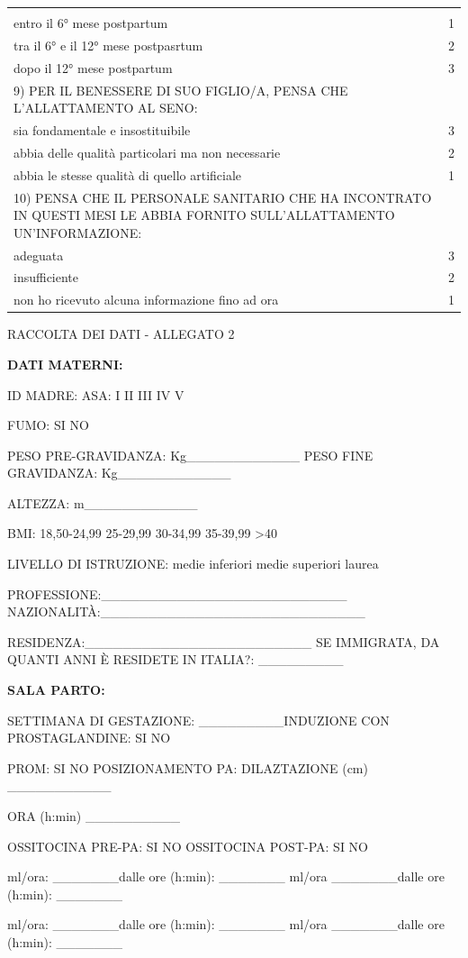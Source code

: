 \documentclass[]{article}
\begin{document}
\begin{longtable}[]{@{}ll@{}}
&\tabularnewline
entro il 6° mese postpartum & 1\tabularnewline
tra il 6° e il 12° mese postpasrtum & 2\tabularnewline
dopo il 12° mese postpartum & 3\tabularnewline
9) PER IL BENESSERE DI SUO FIGLIO/A, PENSA CHE L'ALLATTAMENTO AL SENO:
&\tabularnewline
sia fondamentale e insostituibile & 3\tabularnewline
abbia delle qualità particolari ma non necessarie & 2\tabularnewline
abbia le stesse qualità di quello artificiale & 1\tabularnewline
10) PENSA CHE IL PERSONALE SANITARIO CHE HA INCONTRATO IN QUESTI MESI LE
ABBIA FORNITO SULL'ALLATTAMENTO UN'INFORMAZIONE: &\tabularnewline
adeguata & 3\tabularnewline
insufficiente & 2\tabularnewline
non ho ricevuto alcuna informazione fino ad ora & 1\tabularnewline
\bottomrule
\end{longtable}

{RACCOLTA DEI DATI - ALLEGATO 2 }

\textbf{DATI MATERNI: }

ID MADRE: { } ASA: I II III IV V

FUMO: SI NO

PESO PRE-GRAVIDANZA: Kg\_\_\_\_\_\_\_\_\_\_\_\_ PESO FINE GRAVIDANZA:
Kg\_\_\_\_\_\_\_\_\_\_\_\_

ALTEZZA: m\_\_\_\_\_\_\_\_\_\_\_\_

BMI: 18,50-24,99 25-29,99 30-34,99 35-39,99 \textgreater{}40

LIVELLO DI ISTRUZIONE: medie inferiori medie superiori laurea

PROFESSIONE:\_\_\_\_\_\_\_\_\_\_\_\_\_\_\_\_\_\_\_\_\_\_\_\_\_\_
NAZIONALITÀ:\_\_\_\_\_\_\_\_\_\_\_\_\_\_\_\_\_\_\_\_\_\_\_\_\_\_\_\_

RESIDENZA:\_\_\_\_\_\_\_\_\_\_\_\_\_\_\_\_\_\_\_\_\_\_\_\_ SE IMMIGRATA,
DA QUANTI ANNI È RESIDETE IN ITALIA?: \_\_\_\_\_\_\_\_\_

\textbf{SALA PARTO:}

SETTIMANA DI GESTAZIONE: \_\_\_\_\_\_\_\_\_INDUZIONE CON PROSTAGLANDINE:
SI NO

PROM: SI NO POSIZIONAMENTO PA: DILAZTAZIONE (cm) \_\_\_\_\_\_\_\_\_\_\_

ORA (h:min) \_\_\_\_\_\_\_\_\_\_

OSSITOCINA PRE-PA: SI NO OSSITOCINA POST-PA: SI NO

ml/ora: \_\_\_\_\_\_\_dalle ore (h:min): \_\_\_\_\_\_\_ ml/ora
\_\_\_\_\_\_\_dalle ore (h:min): \_\_\_\_\_\_\_

ml/ora: \_\_\_\_\_\_\_dalle ore (h:min): \_\_\_\_\_\_\_ ml/ora
\_\_\_\_\_\_\_dalle ore (h:min): \_\_\_\_\_\_\_
\end{document}
